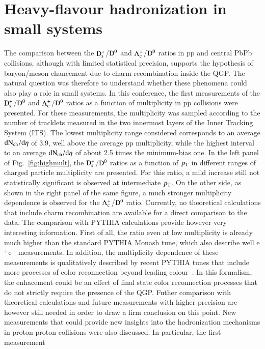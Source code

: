 \documentclass[3p,times,procedia]{elsarticle}
\newcommand{\pt}{p_{\rm T}}
\newcommand{\Dzero}{{\rm D^0}}
\newcommand{\Ds}{{\rm D_{s}^+}}
\newcommand{\Lc}{{\rm \Lambda_{c}^+}}
\begin{document}
\section{Heavy-flavour hadronization in small systems}
\label{recombination}
The comparison between the $\Ds$/$\Dzero$ and $\Lc$/$\Dzero$ ratios in pp and central PbPb collisions, although with limited statistical precision, 
supports the hypothesis of baryon/meson ehancement due to charm recombination inside the QGP. The natural question was therefore to 
understand whether these phenomena could also play a role in small systems.
In this conference, the first measurements of the $\Ds$/$\Dzero$ and $\Lc$/$\Dzero$ ratios as a function of multiplicity in pp collisions were presented.
For these measurements, the multiplicity was sampled according to the number of tracklets measured in the two innermost layers of the Inner Tracking 
System (ITS). The lowest multiplicity range considered corresponds to an average $\rm dN_{ch}/d\eta$ of 3.9, well above the average pp multiplicity, while 
the highest interval to an average $\rm dN_{ch}/d\eta$ of about 2.5 times the minimum-bias one.
In the left panel of Fig.~\ref{fig:highmult}, the $\Ds$/$\Dzero$ ratios as a function of $\pt$ in different ranges of charged particle multiplicity are presented. 
For this ratio, a mild increase still not statistically significant is observed at intermediate $\pt$. 
On the other side, as shown in the right panel of the same figure, a much stronger multiplicity dependence is observed 
for the $\Lc$/$\Dzero$ ratio. Currently, no theoretical calculations that include charm recombination are available for a direct comparison to the data.
The comparison with PYTHIA calculations provide however very interesting information. First of all, the ratio even at 
low multiplicity is already much higher than the standard PYTHIA Monash tune, which also describe well e$^+$e$^-$ measurements. In addition,
the multiplicity dependence of these measurements is qualitatively described by recent PYTHIA tunes 
that include more processes of color reconnection beyond leading colour~\cite{pythia8CR}. In this formalism, the enhacement could be an effect of 
final state color reconnection processes that do not strictly require the presence of the QGP. 
Futher comparison with theoretical calculations and future measurements with higher precision are however still needed in order to draw a firm conclusion on this point.
New measurements that could provide new insights into the hadronization mechanisms in proton-proton collisions were also discussed. In particular, the first measurement 
\end{document}
